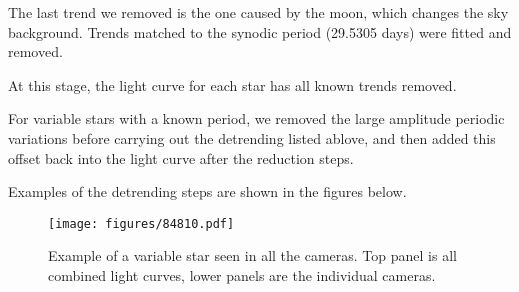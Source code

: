 \documentclass{aa}
\begin{document}
The last trend we removed is the one caused by the moon, which changes the sky background.
%
Trends matched to the synodic period (29.5305 days) were fitted and removed.
%


At this stage, the light curve for each star has all known trends removed.

For variable stars with a known period, we removed the large amplitude periodic variations before carrying out the detrending listed ablove, and then added this offset back into the light curve after the reduction steps.

Examples of the detrending steps are shown in the figures below.


\begin{figure*}
    \centering
    \texttt{[image: figures/84810.pdf]}
    \caption{Example of a variable star seen in all the cameras.
    Top panel is all combined light curves, lower panels are the individual cameras.}
    \label{fig:cleaned_output}
\end{figure*}



\end{document}
